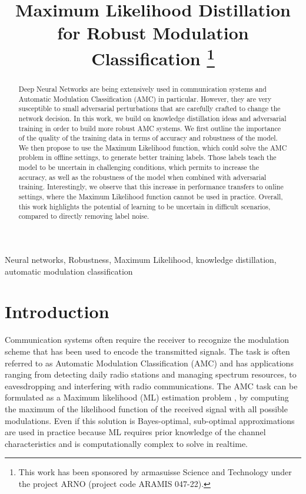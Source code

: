 \documentclass[conference]{IEEEtran}
\title{Maximum Likelihood Distillation for Robust Modulation Classification
\thanks{This work has been sponsored by armasuisse Science and Technology under the project ARNO (project code ARAMIS 047-22).}
}
\author{\IEEEauthorblockN{Javier Maroto}
\IEEEauthorblockA{\textit{Signal Processing Laboratory (LTS4)} \\ \textit{EPFL, Switzerland}}
\and
\IEEEauthorblockN{Gérôme Bovet}
\IEEEauthorblockA{\textit{armasuisse Science\&Technology} \\
\textit{Cyber-Defence Campus, Switzerland}}
\and
\IEEEauthorblockN{Pascal Frossard}
\IEEEauthorblockA{\textit{Signal Processing Laboratory (LTS4)} \\ \textit{EPFL, Switzerland}}}
\begin{document}
\maketitle

\begin{abstract}
Deep Neural Networks are being extensively used in communication systems and Automatic Modulation Classification (AMC) in particular. However, they are very susceptible to small adversarial perturbations that are carefully crafted to change the network decision. In this work, we build on knowledge distillation ideas and adversarial training in order to build more robust AMC systems. We first outline the importance of the quality of the training data in terms of accuracy and robustness of the model. We then propose to use the Maximum Likelihood function, which could solve the AMC problem in offline settings, to generate better training labels. Those labels teach the model to be uncertain in challenging conditions, which permits to increase the accuracy, as well as the robustness of the model when combined with adversarial training. Interestingly, we observe that this increase in performance transfers to online settings, where the Maximum Likelihood function cannot be used in practice. Overall, this work highlights the potential of learning to be uncertain in difficult scenarios, compared to directly removing label noise.
\end{abstract}

\begin{IEEEkeywords}
Neural networks, Robustness, Maximum Likelihood, knowledge distillation, automatic modulation classification
\end{IEEEkeywords}

\section{Introduction}

Communication systems often require the receiver to recognize the modulation scheme that has been used to encode the transmitted signals. The task is often referred to as Automatic Modulation Classification (AMC) and has applications ranging from detecting daily radio stations and managing spectrum resources, to eavesdropping and interfering with radio communications. The AMC task can be formulated as a Maximum likelihood (ML) estimation problem \cite{huan1995likelihood,dobre2007survey,hameed2009likelihood}, by computing the maximum of the likelihood function of the received signal with all possible modulations. Even if this solution is Bayes-optimal, sub-optimal approximations are used in practice \cite{dobre2007survey,Hameed_Dobre_Popescu_2009} because ML requires prior knowledge of the channel characteristics and is computationally complex to solve in realtime.
\end{document}
